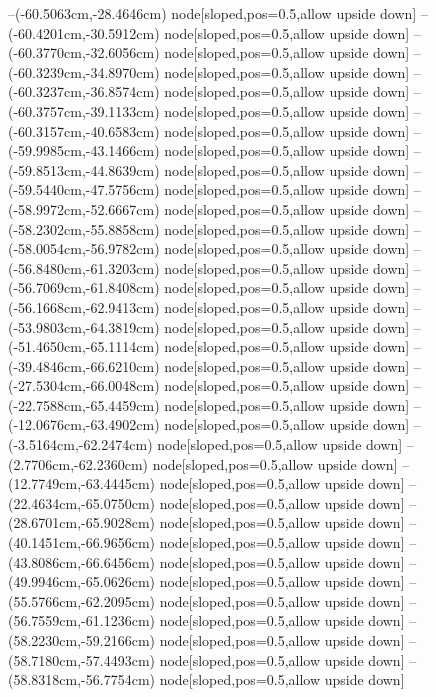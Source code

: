 --(-60.5063cm,-28.4646cm) node[sloped,pos=0.5,allow upside down]{\ArrowIn}
--(-60.4201cm,-30.5912cm) node[sloped,pos=0.5,allow upside down]{\ArrowIn}
--(-60.3770cm,-32.6056cm) node[sloped,pos=0.5,allow upside down]{\ArrowIn}
--(-60.3239cm,-34.8970cm) node[sloped,pos=0.5,allow upside down]{\ArrowIn}
--(-60.3237cm,-36.8574cm) node[sloped,pos=0.5,allow upside down]{\ArrowIn}
--(-60.3757cm,-39.1133cm) node[sloped,pos=0.5,allow upside down]{\ArrowIn}
--(-60.3157cm,-40.6583cm) node[sloped,pos=0.5,allow upside down]{\ArrowIn}
--(-59.9985cm,-43.1466cm) node[sloped,pos=0.5,allow upside down]{\ArrowIn}
--(-59.8513cm,-44.8639cm) node[sloped,pos=0.5,allow upside down]{\ArrowIn}
--(-59.5440cm,-47.5756cm) node[sloped,pos=0.5,allow upside down]{\ArrowIn}
--(-58.9972cm,-52.6667cm) node[sloped,pos=0.5,allow upside down]{\ArrowIn}
--(-58.2302cm,-55.8858cm) node[sloped,pos=0.5,allow upside down]{\ArrowIn}
--(-58.0054cm,-56.9782cm) node[sloped,pos=0.5,allow upside down]{\ArrowIn}
--(-56.8480cm,-61.3203cm) node[sloped,pos=0.5,allow upside down]{\ArrowIn}
--(-56.7069cm,-61.8408cm) node[sloped,pos=0.5,allow upside down]{\arrowIn}
--(-56.1668cm,-62.9413cm) node[sloped,pos=0.5,allow upside down]{\ArrowIn}
--(-53.9803cm,-64.3819cm) node[sloped,pos=0.5,allow upside down]{\ArrowIn}
--(-51.4650cm,-65.1114cm) node[sloped,pos=0.5,allow upside down]{\ArrowIn}
--(-39.4846cm,-66.6210cm) node[sloped,pos=0.5,allow upside down]{\ArrowIn}
--(-27.5304cm,-66.0048cm) node[sloped,pos=0.5,allow upside down]{\ArrowIn}
--(-22.7588cm,-65.4459cm) node[sloped,pos=0.5,allow upside down]{\ArrowIn}
--(-12.0676cm,-63.4902cm) node[sloped,pos=0.5,allow upside down]{\ArrowIn}
--(-3.5164cm,-62.2474cm) node[sloped,pos=0.5,allow upside down]{\ArrowIn}
--(2.7706cm,-62.2360cm) node[sloped,pos=0.5,allow upside down]{\ArrowIn}
--(12.7749cm,-63.4445cm) node[sloped,pos=0.5,allow upside down]{\ArrowIn}
--(22.4634cm,-65.0750cm) node[sloped,pos=0.5,allow upside down]{\ArrowIn}
--(28.6701cm,-65.9028cm) node[sloped,pos=0.5,allow upside down]{\ArrowIn}
--(40.1451cm,-66.9656cm) node[sloped,pos=0.5,allow upside down]{\ArrowIn}
--(43.8086cm,-66.6456cm) node[sloped,pos=0.5,allow upside down]{\ArrowIn}
--(49.9946cm,-65.0626cm) node[sloped,pos=0.5,allow upside down]{\ArrowIn}
--(55.5766cm,-62.2095cm) node[sloped,pos=0.5,allow upside down]{\ArrowIn}
--(56.7559cm,-61.1236cm) node[sloped,pos=0.5,allow upside down]{\ArrowIn}
--(58.2230cm,-59.2166cm) node[sloped,pos=0.5,allow upside down]{\ArrowIn}
--(58.7180cm,-57.4493cm) node[sloped,pos=0.5,allow upside down]{\ArrowIn}
--(58.8318cm,-56.7754cm) node[sloped,pos=0.5,allow upside down]{\arrowIn}
